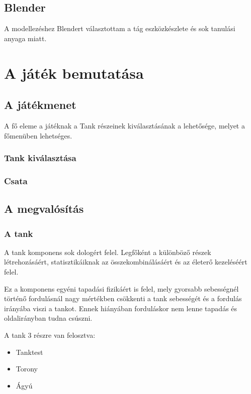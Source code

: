 \documentclass[
]{thesis-ekf}
\theoremstyle{definition}
\theoremstyle{remark}
\begin{document}
\section{Blender}

A modellezéshez Blendert választottam a tág eszközkészlete és sok tanulási anyaga miatt.


\chapter{A játék bemutatása}


\section{A játékmenet}

A fő eleme a játéknak a Tank részeinek kiválasztásának a lehetősége, melyet a főmenüben lehetséges.
\subsection{Tank kiválasztása}

\subsection{Csata}



\section{A megvalósítás}

\subsection{A tank}

A tank komponens sok dologért felel. Legfőként a különböző részek létrehozásáért, statisztikáiknak az összekombinálásáért és az életerő kezeléséért felel.


Ez a komponens egyéni tapadási fizikáért is felel, mely gyorsabb sebességnél történő fordulásnál nagy mértékben csökkenti a tank sebességét és a fordulás irányába viszi a tankot. Ennek hiányában forduláskor nem lenne tapadás és oldalirányban tudna csúszni.




A tank 3 részre van felosztva:
\begin{itemize}
    \item Tanktest
    \item Torony
    \item Ágyú
\end{itemize}
\end{document}
